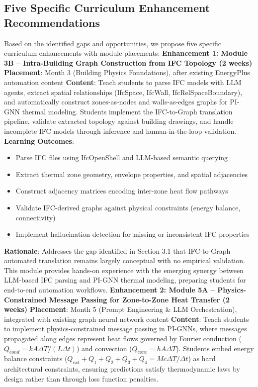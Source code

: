 \documentclass[12pt,a4paper]{article}
\begin{document}
\subsection{Five Specific Curriculum Enhancement Recommendations}
Based on the identified gaps and opportunities, we propose five specific curriculum enhancements with module placements:
\textbf{Enhancement 1: Module 3B -- Intra-Building Graph Construction from IFC Topology (2 weeks)}
\textbf{Placement}: Month 3 (Building Physics Foundations), after existing EnergyPlus automation content
\textbf{Content}: Teach students to parse IFC models with LLM agents, extract spatial relationships (IfcSpace, IfcWall, IfcRelSpaceBoundary), and automatically construct zones-as-nodes and walls-as-edges graphs for PI-GNN thermal modeling. Students implement the IFC-to-Graph translation pipeline, validate extracted topology against building drawings, and handle incomplete IFC models through inference and human-in-the-loop validation.
\textbf{Learning Outcomes}:
\begin{itemize}
  \item Parse IFC files using IfcOpenShell and LLM-based semantic querying
  \item Extract thermal zone geometry, envelope properties, and spatial adjacencies
  \item Construct adjacency matrices encoding inter-zone heat flow pathways
  \item Validate IFC-derived graphs against physical constraints (energy balance, connectivity)
  \item Implement hallucination detection for missing or inconsistent IFC properties
\end{itemize}
\textbf{Rationale}: Addresses the gap identified in Section 3.1 that IFC-to-Graph automated translation remains largely conceptual with no empirical validation. This module provides hands-on experience with the emerging synergy between LLM-based IFC parsing and PI-GNN thermal modeling, preparing students for end-to-end automation workflows.
\textbf{Enhancement 2: Module 5A -- Physics-Constrained Message Passing for Zone-to-Zone Heat Transfer (2 weeks)}
\textbf{Placement}: Month 5 (Prompt Engineering \& LLM Orchestration), integrated with existing graph neural network content
\textbf{Content}: Teach students to implement physics-constrained message passing in PI-GNNs, where messages propagated along edges represent heat flows governed by Fourier conduction ($Q_{cond} = kA\Delta T/(L\Delta t)$) and convection ($Q_{conv} = hA\Delta T$). Students embed energy balance constraints ($Q_{ext} + Q_1 + Q_2 + Q_3 + Q_4 = Mc\Delta T/\Delta t$) as hard architectural constraints, ensuring predictions satisfy thermodynamic laws by design rather than through loss function penalties.
\end{document}
